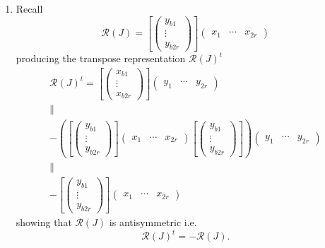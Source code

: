 \documentclass[aps,preprint]{revtex4}
\begin{document}
\begin{enumerate}
\item Recall 
\begin{equation}
\mathcal{R}\left( J\right) =\left[ \left( 
\begin{array}{c}
y_{b1} \\ 
\vdots \\ 
y_{b2r}%
\end{array}%
\right) \right] \left( 
\begin{array}{ccc}
x_{1} & \cdots & x_{2r}%
\end{array}%
\right)
\end{equation}%
producing the transpose representation $\mathcal{R}\left( J\right) ^{t}$ 
\begin{gather}
\mathcal{R}\left( J\right) ^{t}=\left[ \left( 
\begin{array}{c}
x_{b1} \\ 
\vdots \\ 
x_{b2r}%
\end{array}%
\right) \right] \left( 
\begin{array}{ccc}
y_{1} & \cdots & y_{2r}%
\end{array}%
\right) \\
\parallel \\
-\left( \overset{}{\left[ \left( 
\begin{array}{c}
y_{b1} \\ 
\vdots \\ 
y_{b2r}%
\end{array}%
\right) \right] \left( 
\begin{array}{ccc}
x_{1} & \cdots & x_{2r}%
\end{array}%
\right) \left[ \left( 
\begin{array}{c}
y_{b1} \\ 
\vdots \\ 
y_{b2r}%
\end{array}%
\right) \right] }\right) \left( 
\begin{array}{ccc}
y_{1} & \cdots & y_{2r}%
\end{array}%
\right) \\
\parallel \\
-\left[ \left( 
\begin{array}{c}
y_{b1} \\ 
\vdots \\ 
y_{b2r}%
\end{array}%
\right) \right] \left( 
\begin{array}{ccc}
x_{1} & \cdots & x_{2r}%
\end{array}%
\right)
\end{gather}%
showing that $\mathcal{R}\left( J\right) $ is antisymmetric i.e. 
\begin{equation}
\mathcal{R}\left( J\right) ^{t}=-\mathcal{R}\left( J\right) .
\end{equation}
\end{enumerate}
\end{document}

